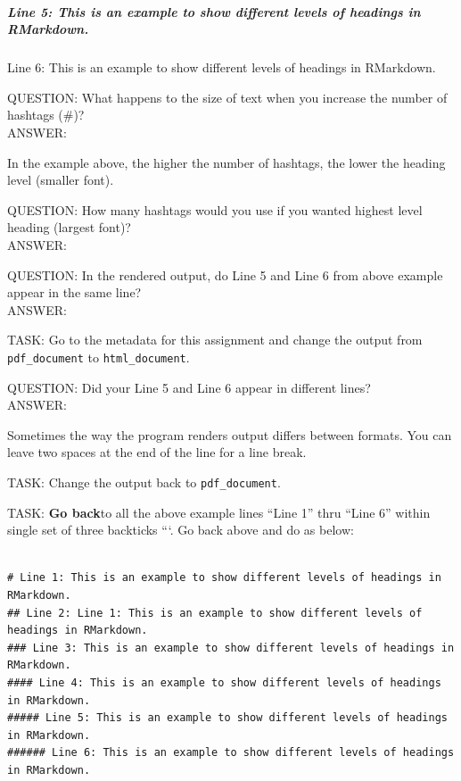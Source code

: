 \documentclass[
]{article}
\begin{document}
\subparagraph{Line 5: This is an example to show different levels of
headings in
RMarkdown.}\label{line-5-this-is-an-example-to-show-different-levels-of-headings-in-rmarkdown.}

Line 6: This is an example to show different levels of headings in
RMarkdown.

QUESTION: What happens to the size of text when you increase the number
of hashtags (\#)?\\
ANSWER:

\hfill\break

In the example above, the higher the number of hashtags, the lower the
heading level (smaller font).

QUESTION: How many hashtags would you use if you wanted highest level
heading (largest font)?\\
ANSWER:

\hfill\break

QUESTION: In the rendered output, do Line 5 and Line 6 from above
example appear in the same line?\\
ANSWER:

\hfill\break

TASK: Go to the metadata for this assignment and change the output from
\texttt{pdf\_document} to \texttt{html\_document}.

QUESTION: Did your Line 5 and Line 6 appear in different lines?\\
ANSWER:

\hfill\break

Sometimes the way the program renders output differs between formats.
You can leave two spaces at the end of the line for a line break.

TASK: Change the output back to \texttt{pdf\_document}.

TASK: \textbf{Go back}to all the above example lines ``Line 1'' thru
``Line 6'' within single set of three backticks ```. Go back above and
do as below:

\begin{verbatim}

# Line 1: This is an example to show different levels of headings in RMarkdown.
## Line 2: Line 1: This is an example to show different levels of headings in RMarkdown.
### Line 3: This is an example to show different levels of headings in RMarkdown.
#### Line 4: This is an example to show different levels of headings in RMarkdown.
##### Line 5: This is an example to show different levels of headings in RMarkdown.   
###### Line 6: This is an example to show different levels of headings in RMarkdown.
\end{verbatim}
\end{document}
